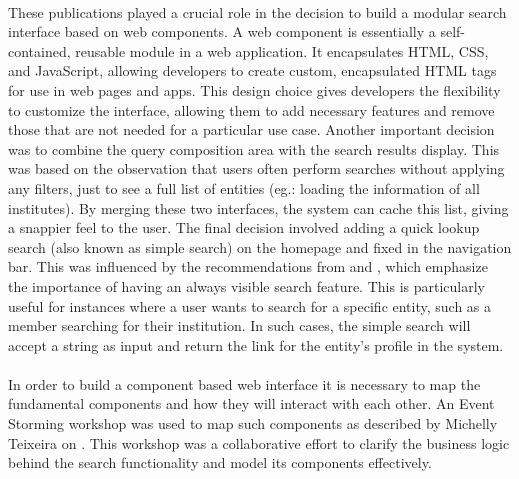 \paragraph{} These publications played a crucial role in the decision to build a modular search interface based on web components. A web component is essentially a self-contained, reusable module in a web application. It encapsulates HTML, CSS, and JavaScript, allowing developers to create custom, encapsulated HTML tags for use in web pages and apps. This design choice gives developers the flexibility to customize the interface, allowing them to add necessary features and remove those that are not needed for a particular use case. Another important decision was to combine the query composition area with the search results display. This was based on the observation that users often perform searches without applying any filters, just to see a full list of entities (eg.: loading the information of all institutes). By merging these two interfaces, the system can cache this list, giving a snappier feel to the user. The final decision involved adding a quick lookup search (also known as simple search) on the homepage and fixed in the navigation bar. This was influenced by the recommendations from \cite{Nielsen2001SearchVisible} and \cite{RawoolAdvancedSearch}, which emphasize the importance of having an always visible search feature. This is particularly useful for instances where a user wants to search for a specific entity, such as a member searching for their institution. In such cases, the simple search will accept a string as input and return the link for the entity's profile in the system.


\paragraph{} In order to build a component based web interface it is necessary to map the fundamental components and how they will interact with each other.  An Event Storming workshop was used to map such components as described by Michelly Teixeira on \cite{michelly} . This workshop was a collaborative effort to clarify the business logic behind the search functionality and model its components effectively.



